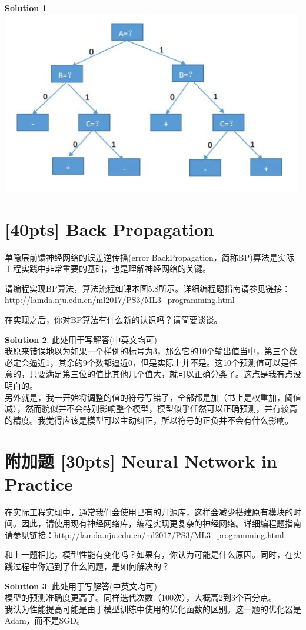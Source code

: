 \documentclass[a4paper,UTF8]{article}
\numberwithin{equation}{section}
\theoremstyle{definition}
\newtheorem*{solution}{Solution}
\begin{document}
\begin{solution}
\includegraphics[height=8cm]{a.jpg}
\end{solution}

\section{[40pts] Back Propagation} 
单隐层前馈神经网络的误差逆传播(error BackPropagation，简称BP)算法是实际工程实践中非常重要的基础，也是理解神经网络的关键。

请编程实现BP算法，算法流程如课本图5.8所示。详细编程题指南请参见链接：\url{http://lamda.nju.edu.cn/ml2017/PS3/ML3_programming.html}

在实现之后，你对BP算法有什么新的认识吗？请简要谈谈。
\begin{solution}
此处用于写解答(中英文均可)\\
我原来错误地以为如果一个样例的标号为3，那么它的10个输出值当中，第三个数必定会逼近1，其余的9个数都逼近0，但是实际上并不是。这10个预测值可以是任意的，只要满足第三位的值比其他几个值大，就可以正确分类了。这点是我有点没明白的。\\
另外就是，我一开始将调整的值的符号写错了，全部都是加（书上是权重加，阈值减），然而貌似并不会特别影响整个模型，模型似乎任然可以正确预测，并有较高的精度。我觉得应该是模型可以主动纠正，所以符号的正负并不会有什么影响。
\end{solution}

\section*{附加题   [30pts] Neural Network in Practice}
在实际工程实现中，通常我们会使用已有的开源库，这样会减少搭建原有模块的时间。因此，请使用现有神经网络库，编程实现更复杂的神经网络。详细编程题指南请参见链接：\url{http://lamda.nju.edu.cn/ml2017/PS3/ML3_programming.html}

和上一题相比，模型性能有变化吗？如果有，你认为可能是什么原因。同时，在实践过程中你遇到了什么问题，是如何解决的？
\begin{solution}
此处用于写解答(中英文均可)\\
模型的预测准确度更高了。同样迭代次数（100次），大概高2到3个百分点。\\
我认为性能提高可能是由于模型训练中使用的优化函数的区别。这一题的优化器是Adam，而不是SGD。
\end{solution}
\end{document}
